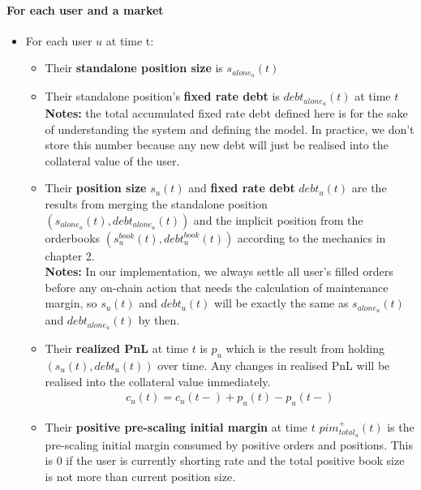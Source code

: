\documentclass{article}%
\begin{document}
\paragraph{For each user and a market}
\begin{itemize}
    \item For each user $u$ at time t:
        \begin{itemize}
            \item Their \textbf{standalone position size} is $s_{alone_u}(t)$
            \item Their standalone position's \textbf{fixed rate debt} is $debt_{alone_u}(t)$ at time $t$\\
            
            \textbf{Notes:} the total accumulated fixed rate debt defined here is for the sake of understanding the system and defining the model. In practice, we don't store this number because any new debt will just be realised into the collateral value of the user.
            \item Their \textbf{position size} $s_u(t)$ and \textbf{fixed rate debt} $debt_u(t)$ are the results from merging the standalone position $(s_{alone_u}(t), debt_{alone_u}(t))$ and the implicit position from the orderbooks $(s_{u}^{book}(t), debt_{u}^{book}(t))$ according to the mechanics in chapter 2.\\
            \textbf{Notes:} In our implementation, we always settle all user's filled orders before any on-chain action that needs the calculation of maintenance margin, so $s_u(t)$ and $debt_u(t)$ will be exactly the same as $s_{alone_u}(t)$ and $debt_{alone_u}(t)$ by then.
            \item Their \textbf{realized PnL} at time $t$ is $p_u$ which is the result from holding $(s_u(t), debt_u(t))$ over time. Any changes in realised PnL will be realised into the collateral value immediately.
                \begin{align*}
                    c_u(t) = c_u(t-) + p_u(t) - p_u(t-)
                \end{align*}
            \item Their \textbf{positive pre-scaling initial margin} at time $t$ $pim_{total_u}^+(t)$ is the pre-scaling initial margin consumed by positive orders and positions. This is 0 if the user is currently shorting rate and the total positive book size is not more than current position size.
            

\end{itemize}
\end{itemize}
\end{document}
